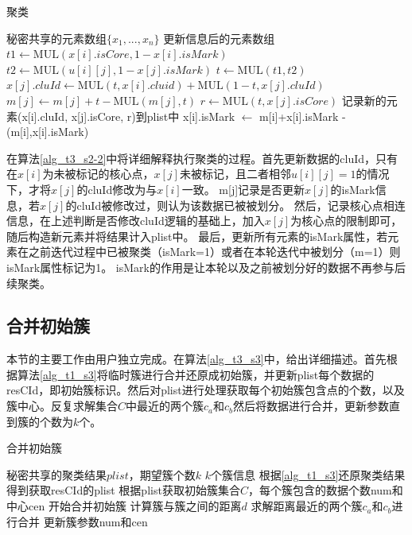 \begin{algorithm}[htbp]
	\renewcommand{\algorithmicrequire}{\textbf{输入:}}
	\renewcommand{\algorithmicensure}{\textbf{输出:}}
	\caption{聚类}
	\label{alg_t3_s2-2} %
	\begin{algorithmic}[1]
		\REQUIRE 秘密共享的元素数组$ \{x_1,...,x_n\} $
		\ENSURE 更新信息后的元素数组
		\STATE $ t1 \leftarrow  \text{MUL}(x[i].isCore,1-x[i].isMark)$
		\STATE $ t2 \leftarrow \text{MUL}(u[i][j],1-x[j].isMark) $
		\STATE $t \leftarrow \text{MUL}(t1, t2)$
		\STATE $x[j].cluId \leftarrow \text{MUL}(t, x[i].cluid) + \text{MUL}(1-t, x[j].cluId)$
		\STATE $m[j] \leftarrow m[j] + t - \text{MUL}(m[j], t)$
		\STATE $r \leftarrow \text{MUL}(t, x[j].isCore)$
		\STATE 记录新的元素(x[i].cluId, x[j].isCore, r)到plist中
		\ENDFOR
		\ENDFOR
		\STATE x[i].isMark $\leftarrow$ m[i]+x[i].isMark - (m[i],x[i].isMark)
		\ENDFOR

	\end{algorithmic}
\end{algorithm}

在算法\ref{alg_t3_s2-2}中将详细解释执行聚类的过程。首先更新数据的cluId，只有在$x[i]$为未被标记的核心点，$x[j]$未被标记，且二者相邻$u[i][j]=1$的情况下，才将$x[j]$的cluId修改为与$x[i]$一致。
m[j]记录是否更新$x[j]$的isMark信息，若$x[j]$的cluId被修改过，则认为该数据已被被划分。
然后，记录核心点相连信息，在上述判断是否修改cluId逻辑的基础上，加入$x[j]$为核心点的限制即可，随后构造新元素并将结果计入plist中。
最后，更新所有元素的isMark属性，若元素在之前迭代过程中已被聚类（isMark=1）或者在本轮迭代中被划分（m=1）则isMark属性标记为1。
isMark的作用是让本轮以及之前被划分好的数据不再参与后续聚类。

\subsection{合并初始簇}
本节的主要工作由用户独立完成。在算法\ref{alg_t3_s3}中，给出详细描述。首先根据算法\ref{alg_t1_s3}将临时簇进行合并还原成初始簇，并更新plist每个数据的resCId，即初始簇标识。然后对plist进行处理获取每个初始簇包含点的个数，以及簇中心。反复求解集合$ C $中最近的两个簇$ c_a $和$ c_b $然后将数据进行合并，更新参数直到簇的个数为$ k $个。
\begin{algorithm}[htbp]
	\renewcommand{\algorithmicrequire}{\textbf{输入:}}
	\renewcommand{\algorithmicensure}{\textbf{输出:}}
	\caption{合并初始簇}
	\label{alg_t3_s3}
	\begin{algorithmic}[1]
		\REQUIRE 秘密共享的聚类结果$plist$，期望簇个数$k$
		\ENSURE $k$个簇信息
		\STATE 根据\ref{alg_t1_s3}还原聚类结果得到获取resCId的plist
		\STATE 根据plist获取初始簇集合$ C $，每个簇包含的数据个数num和中心cen
		\STATE 开始合并初始簇
		\STATE 计算簇与簇之间的距离$d$
		\STATE 求解距离最近的两个簇$c_a$和$c_b$进行合并
		\STATE 更新簇参数num和cen
		\ENDWHILE
	\end{algorithmic}
\end{algorithm}
